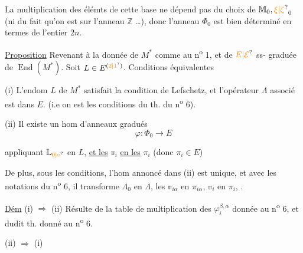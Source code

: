 La multiplication des élémts de cette base ne dépend pas du choix de $\mathbb M_0,\unsure{\xi|\zeta}_0$ (ni du fait qu'on est sur l'anneau $\mathbb Z$ \ldots), donc l'anneau $\Phi_0$ est bien déterminé en termes de l'entier  $2n$.

\uline{Proposition} Revenant à la donnée de $M^*$ comme au n\textsuperscript{o} 1, et de $\unsure{E|\mathcal E}$ ss- graduée de  $\operatorname{End}(M^*)$. Soit $L\in E^{(\unsure{2|1})}$. Conditions équivalentes

(i) L'endom $L$ de $M^*$ satisfait la condition de  Lefschetz, et l'opérateur $\Lambda$ associé est dans $E$. (i.e on est  les conditions du th. du n\textsuperscript{o} 6).

(ii) Il existe un hom d'anneaux gradués
\[
 \varphi:\Phi_0\longrightarrow E
\]

appliquant $\mathbb L_{\unsure{0|\circ}}$ en $L$, \uline{et les} $\mathbb{\pi}_i$ \uline{en les} $\pi_i$   (donc $\pi_i\in E$)


De plus, sous les conditions, l'hom annoncé dans (ii) est unique,  et avec les notations du n\textsuperscript{o} 6, il transforme $\mathbb{\Lambda}_0$ en $\Lambda$, les \deleted{\unsure{$\pi_\alpha$}} $\mathbb{\pi}_{i\alpha}$ en $\pi_{i\alpha}$, $\mathbb{\pi}_i$ en $\pi_i$,  .

\uline{Dém} (i) $\Rightarrow$ (ii) Résulte de la table de multiplication des $\varphi_i^{\beta,\alpha}$ donnée au n\textsuperscript{o} 6, et dudit th. donné au n\textsuperscript{o} 6.

(ii) $\Rightarrow$ (i) 

